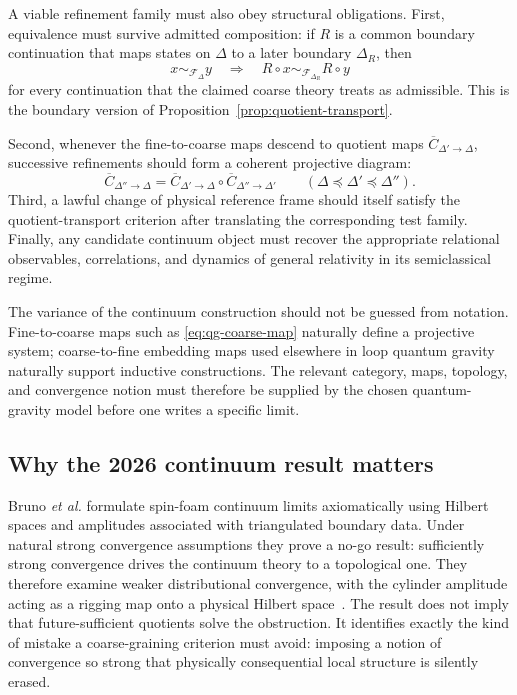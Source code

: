 \documentclass[11pt]{article}
\newcommand{\F}{\mathcal F}
\begin{document}
A viable refinement family must also obey structural obligations. First, equivalence must survive admitted composition: if $R$ is a common boundary continuation that maps states on $\Delta$ to a later boundary $\Delta_R$, then
\begin{equation}
  x\sim_{\F_{\Delta}}y
  \quad\Longrightarrow\quad
  R\circ x\sim_{\F_{\Delta_R}}R\circ y
  \label{eq:qg-composition-closure}
\end{equation}
for every continuation that the claimed coarse theory treats as admissible. This is the boundary version of Proposition~\ref{prop:quotient-transport}.

Second, whenever the fine-to-coarse maps descend to quotient maps $\overline C_{\Delta'\to\Delta}$, successive refinements should form a coherent projective diagram:
\begin{equation}
  \overline C_{\Delta''\to\Delta}
  =
  \overline C_{\Delta'\to\Delta}
  \circ
  \overline C_{\Delta''\to\Delta'}
  \qquad
  (\Delta\preceq\Delta'\preceq\Delta'').
  \label{eq:qg-projective}
\end{equation}
Third, a lawful change of physical reference frame should itself satisfy the quotient-transport criterion after translating the corresponding test family. Finally, any candidate continuum object must recover the appropriate relational observables, correlations, and dynamics of general relativity in its semiclassical regime.

The variance of the continuum construction should not be guessed from notation. Fine-to-coarse maps such as \eqref{eq:qg-coarse-map} naturally define a projective system; coarse-to-fine embedding maps used elsewhere in loop quantum gravity naturally support inductive constructions. The relevant category, maps, topology, and convergence notion must therefore be supplied by the chosen quantum-gravity model before one writes a specific limit.

\subsection{Why the 2026 continuum result matters}

Bruno \emph{et al.} formulate spin-foam continuum limits axiomatically using Hilbert spaces and amplitudes associated with triangulated boundary data. Under natural strong convergence assumptions they prove a no-go result: sufficiently strong convergence drives the continuum theory to a topological one. They therefore examine weaker distributional convergence, with the cylinder amplitude acting as a rigging map onto a physical Hilbert space~\cite{bruno2026}. The result does not imply that future-sufficient quotients solve the obstruction. It identifies exactly the kind of mistake a coarse-graining criterion must avoid: imposing a notion of convergence so strong that physically consequential local structure is silently erased.
\end{document}
